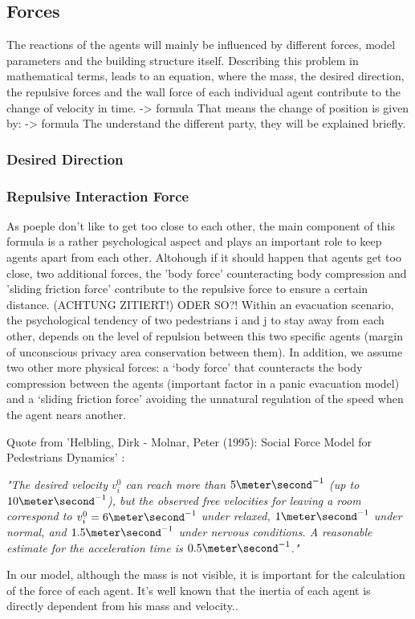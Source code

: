 \documentclass[11pt]{article}
\begin{document}
\subsection {Forces}
The reactions of the agents will mainly be influenced by different forces, model
parameters and the building structure itself. 
Describing this problem in mathematical terms, leads to an equation, where the mass, the desired direction, the repulsive forces and the wall force  of each individual agent contribute to the change of velocity in time.
-> formula
That means the change of position is given by: -> formula
The understand the different party, they will be explained briefly.

\subsubsection{Desired Direction}

\subsubsection{Repulsive Interaction Force}
As poeple don't like to get too close to each other, the main component of this formula is a rather psychological aspect and plays an important role to keep agents apart from each other. Altohough if it should happen that agents get too close, two additional forces, the 'body force' counteracting body compression and 'sliding friction force' contribute to the repulsive force to ensure a certain distance. (ACHTUNG ZITIERT!)
ODER SO?!
Within an evacuation scenario, the psychological tendency of two pedestrians i
and j to stay away from each other, depends on the level of repulsion between
this two specific agents (margin of unconscious privacy area conservation
between them). In addition, we assume two other more physical forces: a `body
force' that counteracts the body compression between the agents (important
factor in a panic evacuation model) and a `sliding friction force' avoiding the
unnatural regulation of the speed when the agent nears another. \cite{SFMPD}

Quote from 'Helbling, Dirk - Molnar, Peter (1995): Social Force Model for Pedestrians Dynamics' \cite{SFMPD} :
\begin{center}
\textit{"The desired velocity $v^0_i$ can reach more than $5 \meter\second^{-1}$ (up to $10 \meter\second^{-1}$), but the observed free velocities	for	leaving	a	room	correspond	to	$v^0_i=6 \meter\second^{-1}$ under relaxed, $1\meter\second^{-1}$ under normal, and $1.5\meter\second^{-1}$ under nervous conditions. A reasonable estimate for the acceleration time is $0.5\meter\second^{-1}$."}
\end{center}
In our model, although the mass is not visible, it is important for
the calculation of the force of each agent. It's well known that the inertia of
each agent is directly dependent from his mass and velocity..
\end{document}
